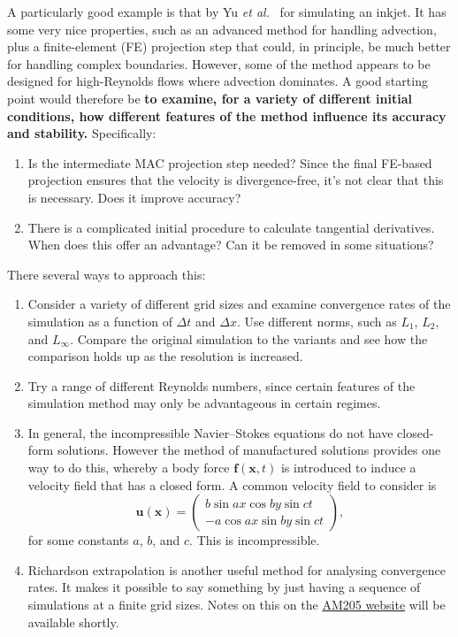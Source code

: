 \documentclass[12pt]{article}
\renewcommand{\vec}[1]{\mathbf{#1}}
\newcommand{\vu}{\vec{u}}
\newcommand{\vx}{\vec{x}}
\begin{document}
A particularly good example is that by Yu \textit{et al.}~\cite{yu03,yu07} for
simulating an inkjet. It has some very nice properties, such as an advanced
method for handling advection, plus a finite-element (FE) projection step that
could, in principle, be much better for handling complex boundaries.
However, some of the method appears to be designed for high-Reynolds flows
where advection dominates. A good starting point would therefore be \textbf{to
examine, for a variety of different initial conditions, how different
features of the method influence its accuracy and stability.} Specifically:
\begin{enumerate}
  \item Is the intermediate MAC projection step needed? Since the final
    FE-based projection ensures that the velocity is divergence-free, it's not
    clear that this is necessary. Does it improve accuracy?
  \item There is a complicated initial procedure to calculate tangential
    derivatives. When does this offer an advantage? Can it be removed in
    some situations?
\end{enumerate}
There several ways to approach this:
\begin{enumerate}
  \item Consider a variety of different grid sizes and examine convergence
    rates of the simulation as a function of $\Delta t$ and $\Delta x$. Use
    different norms, such as $L_1$, $L_2$, and $L_\infty$. Compare the original
    simulation to the variants and see how the comparison holds up as the
    resolution is increased.
  \item Try a range of different Reynolds numbers, since certain features of the
    simulation method may only be advantageous in certain regimes.
  \item In general, the incompressible Navier--Stokes equations do not have
    closed-form solutions. However the method of manufactured solutions
    provides one way to do this, whereby a body force $\vec{f}(\vec{x},t)$ is
    introduced to induce a velocity field that has a closed form. A common
    velocity field to consider is
    \begin{equation}
      \label{eq:vel}
      \vu(\vx) = \left(
      \begin{array}{c}
	b\sin ax \cos by \sin ct \\
	-a\cos ax \sin by \sin ct
      \end{array}
      \right),
    \end{equation}
    for some constants $a$, $b$, and $c$. This is incompressible.
  \item Richardson extrapolation is another useful method for analysing
    convergence rates. It makes it possible to say something by just having a
    sequence of simulations at a finite grid sizes. Notes on this on the
    \href{http://iacs-courses.seas.harvard.edu/courses/am205/}{AM205 website}
    will be available shortly.
\end{enumerate}


\end{document}
